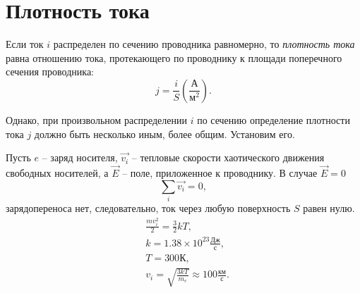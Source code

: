    
   
\section{Плотность тока}

    Если ток \( i \) распределен по сечению проводника равномерно, то
    \textit{плотность тока} равна отношению тока, протекающего по проводнику
    к площади поперечного сечения проводника:
    \[
        j = \frac{i}{S} \left( \frac{\text{А}}{\text{м}^2} \right).
    \]
    
    Однако, при произвольном распределении \( i \) по сечению определение
    плотности тока \( j \) должно быть несколько иным, более общим.
    Установим его.
    
    Пусть \( e \) -- заряд носителя, \( \vec{v_i} \) -- тепловые скорости
    хаотического движения свободных носителей, а  \( \vec{E} \) -- поле,
    приложенное к проводнику. В случае \( \vec{E} = 0 \)
    \[
        \sum\limits_i \vec{v_i} = 0,
    \]
    зарядопереноса нет, следовательно, ток через любую поверхность \( S \)
    равен нулю.
    \begin{align*}
        & \frac{m v_i^2}{2} = \frac{3}{2}kT, \\
        & k = 1.38 \times 10^{23} \frac{\text{Дж}}{\text{с}}, \\
        & T = 300 \text{К}, \\
        & v_i = \sqrt{\frac{3kT}{m_e}} \approx 100 \frac{\text{км}}{\text{с}}.
    \end{align*}
    
